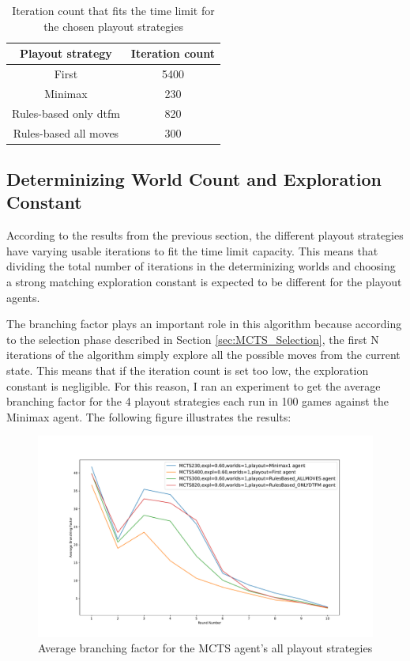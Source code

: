 \begin{table}[H] 
    \centering
    \begin{tabular}{c|c} 
        \textbf{Playout strategy} & \textbf{Iteration count} \\ \hline
        First & 5400 \\ \hline
        Minimax & 230 \\ \hline
        Rules-based only dtfm & 820 \\ \hline
        Rules-based all moves & 300 \\ 
    \end{tabular}
    \caption{Iteration count that fits the time limit for the chosen playout strategies}
\end{table}

\subsection{Determinizing World Count and Exploration Constant}

According to the results from the previous section, the different playout strategies have varying usable iterations to fit the time limit capacity.
This means that dividing the total number of iterations in the determinizing worlds and choosing a strong matching exploration constant is expected to be
different for the playout agents.

The branching factor plays an important role in this algorithm because according to the selection phase described in Section \ref{sec:MCTS_Selection},
the first N iterations of the algorithm simply explore all the possible moves from the current state. This means that if the iteration count is set too low, the exploration 
constant is negligible. For this reason, I ran an experiment to get the average branching factor for the 4 playout strategies each run in 100 games against the Minimax agent.
The following figure illustrates the results:

\begin{figure}[H]
    \caption{Average branching factor for the MCTS agent's all playout strategies}
    \centerline{\mbox{\includegraphics[width=180mm]{img/mcts_average_branching_factor.pdf}}}
    \label{fig:example}
\end{figure}

